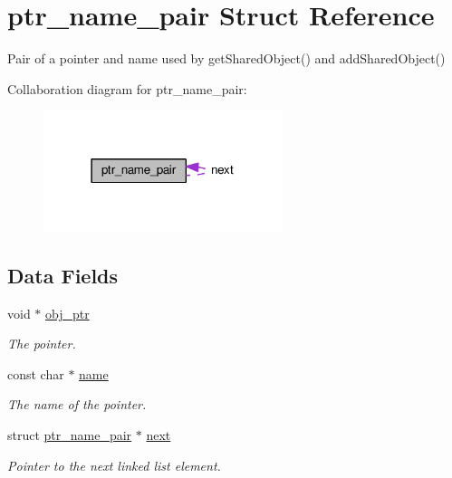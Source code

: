 \hypertarget{structptr__name__pair}{}\section{ptr\+\_\+name\+\_\+pair Struct Reference}
\label{structptr__name__pair}


Pair of a pointer and name used by get\+Shared\+Object() and add\+Shared\+Object()  




Collaboration diagram for ptr\+\_\+name\+\_\+pair\+:\nopagebreak
\begin{figure}[H]
\begin{center}
\leavevmode
\includegraphics[width=198pt]{dc/d56/structptr__name__pair__coll__graph}
\end{center}
\end{figure}
\subsection*{Data Fields}
\begin{DoxyCompactItemize}
\item 
void $\ast$ \hyperlink{structptr__name__pair_a01311f316e1b65593bd8f922651ea1d5}{obj\+\_\+ptr}
\begin{DoxyCompactList}\small\item\em The pointer. \end{DoxyCompactList}\item 
const char $\ast$ \hyperlink{structptr__name__pair_a47da823cca98aa11557f7e3261536b56}{name}
\begin{DoxyCompactList}\small\item\em The name of the pointer. \end{DoxyCompactList}\item 
struct \hyperlink{structptr__name__pair}{ptr\+\_\+name\+\_\+pair} $\ast$ \hyperlink{structptr__name__pair_ae674297b408f0e9ad0c39085eee41b25}{next}
\begin{DoxyCompactList}\small\item\em Pointer to the next linked list element. \end{DoxyCompactList}\end{DoxyCompactItemize}



